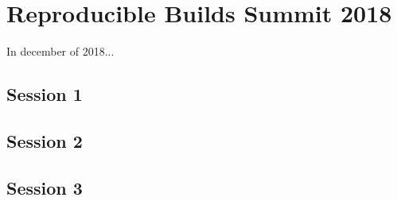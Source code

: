 \documentclass[../Main/thesis.tex]{subfiles}
\begin{document}
\chapter{Reproducible Builds Summit 2018}
\label{ch:repro_summit}

In december of 2018...

\section{Session 1}\label{sec:session_one}
\section{Session 2}\label{sec:session_two}
\section{Session 3}\label{sec:session_three}


\blankpage
\end{document}
